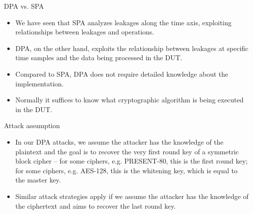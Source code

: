 \begin{frame}{DPA vs. SPA}
    \begin{itemize}
        \item We have seen that SPA analyzes leakages along the time axis, exploiting relationships between leakages and operations.
       \item DPA, on the other hand, exploits the relationship between leakages at specific time samples and the data being processed in the DUT.
       \item Compared to SPA, DPA does not require detailed knowledge about the implementation.
        \item Normally it suffices to know what cryptographic algorithm is being executed in the DUT.
    \end{itemize}
\end{frame}

\begin{frame}{Attack assumption}
    \begin{itemize}
        \item In our DPA attacks, we assume the attacker has the knowledge of the plaintext and the goal is to recover the very first round key of a symmetric block cipher -- for some ciphers, e.g. PRESENT-80, this is the first round key; for some ciphers, e.g. AES-128, this is the whitening key, which is equal to the master key.
        \item Similar attack strategies apply if we assume the attacker has the knowledge of the ciphertext and aims to recover the last round key.
    \end{itemize}
\end{frame}


